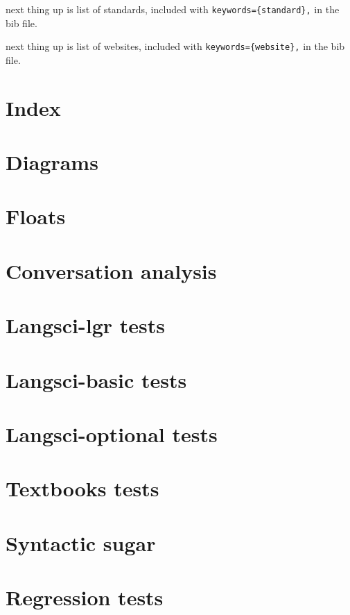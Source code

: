 \documentclass[output=book
  ,colorlinks
  ,showindex
  ,tblseight
  ,nobabel
    ,booklanguage=spanish
  ]{langscibook}
\begin{document}
\printbibliography[notkeyword={techreport},notkeyword={website},title={References}]

next thing up is list of standards, included with \verb+keywords={standard},+ in the bib file.

\printbibliography[keyword={standard},title={Standards}]



next thing up is list of websites, included with \verb+keywords={website},+ in the bib file.

\printbibliography[keyword={website},title={Websites}]



\section{Index}


\section{Diagrams}


\section{Floats}

\section{Conversation analysis}



%
\section{Langsci-lgr tests}


\section{Langsci-basic tests}
% 

\section{Langsci-optional tests}
% 

\section{Textbooks tests}


\section{Syntactic sugar}

\section{Regression tests}


\end{document}
